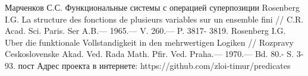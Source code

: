 \documentclass[a4paper,14pt]{extreport}
\begin{document}
\newpage
{}
\begin{thebibliography}{9}
 Марченков С.С. Функциональные системы с операцией суперпозиции
	Rosenberg I.G. La structure des fonctions de plusieurs variables sur un ensemble fini // C.R. Acad. Sci. Paris. Ser A.B.— 1965.— V. 260.— P. 3817- 3819. 
	Rosenberg I.G. Uber die funktionale Vollstandigkeit in den mehrwertigen Logiken // Rozpravy Ceskoslovenske Akad. Ved. Rada Math. Pfir. Ved. Praha.— 1970.— Bd. 80.- S. 3-93. 
пост
 Адрес проекта в интернете: https://github.com/zloi-timur/predicates 

\end{thebibliography}
\end{document}
